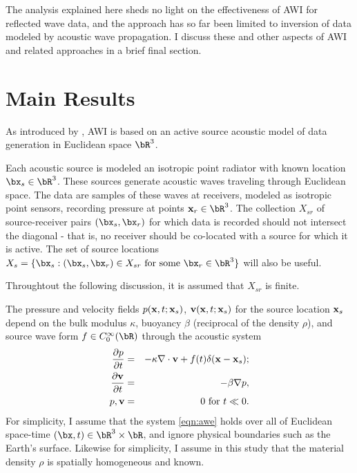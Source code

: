 The analysis explained here sheds no light on the effectiveness of AWI
for reflected wave data, and the approach has so far been limited to
inversion of data modeled by acoustic wave propagation. I discuss
these and other aspects of AWI and related approaches in a brief final
section.

\section{Main Results}

As introduced by \cite{Warner:16}, AWI is based on an
active source acoustic model of data generation in Euclidean space
$\bR^3$. 

Each acoustic source is modeled an isotropic point radiator
with known location $\bx_s\in \bR^3$. These
sources generate acoustic waves traveling through Euclidean space. The
data are samples of these waves at receivers, modeled as isotropic
point sensors, recording pressure at points
${\bf x}_r \in \bR^3$. The collection $X_{sr}$ of source-receiver pairs
$(\bx_s,\bx_r)$ for which data is recorded should not intersect the
diagonal - that is, no receiver should be co-located with a source for
which it is active. The set of source locations $X_s = \{\bx_s: (\bx_s,\bx_r) \in X_{sr}
\mbox{ for some } \bx_r \in \bR^3\}$ will also be useful.

Throughtout the following discussion, it is assumed that
$X_{sr}$ is finite. 
  
The pressure and velocity fields $p({\bf x},t;{\bf x}_s)$,
${\bf v}({\bf x},t;{\bf x}_s)$ for the source location ${\bf x}_s$
depend on the bulk modulus $\kappa$, buoyancy $\beta$
(reciprocal of the density $\rho$), and source wave
form $f \in C_0^{\infty}(\bR)$ through the acoustic system
\begin{eqnarray}
  \label{eqn:awe}
 \frac{\partial p}{\partial t} & = &- \kappa \nabla \cdot {\bf v} +
                                    f(t) \delta({\bf x}-{\bf x}_s); \nonumber \\
\frac{\partial {\bf v}}{\partial t} & = & - \beta \nabla p, \nonumber \\ 
p, {\bf v} & = & 0 \mbox{ for }  t \ll 0.
\end{eqnarray}
For simplicity, I assume that the system \ref{eqn:awe} holds over all of Euclidean
space-time $(\bx,t) \in \bR^3 \times \bR$, and ignore physical
boundaries such as the Earth's surface. Likewise for simplicity, I
assume in this study that the material density $\rho$ is spatially
homogeneous and known.

